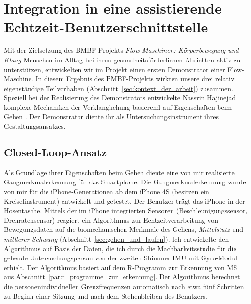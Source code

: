 

\chapter{Integration in eine assistierende Echtzeit-Benutzerschnittstelle} \label{cha:integration_in_eine_assistierende_echtzeit_benutzerschnittstelle}

Mit der Zielsetzung des \acs{BMBF}-Projekts \emph{Flow-Maschinen: Körperbewegung und Klang} Menschen im Alltag bei ihren gesundheitsförderlichen Absichten aktiv zu unterstützen, entwickelten wir im Projekt einen ersten Demonstrator einer Flow-Maschine. In diesem Ergebnis des \acs{BMBF}-Projekts wirkten unsere drei relativ eigenständige Teilvorhaben (Abschnitt~\ref{sec:kontext_der_arbeit}) zusammen. Speziell bei der Realisierung des Demonstrators entwickelte Nassrin Hajinejad komplexe Mechaniken der Verklanglichung basierend auf Eigenschaften beim Gehen \citep{Hajinejad2013, Hajinejad2015}. Der Demonstrator diente ihr als Untersuchungsinstrument ihres Gestaltungsansatzes.

\section{Closed-Loop-Ansatz} 

\label{sec:closed_loop_ansatz}

Als Grundlage ihrer Eigenschaften beim Gehen diente eine von mir realisierte Gangmerkmalerkennung für das Smartphone. Die Gangmerkmalerkennung wurde von mir für die iPhone-Generationen ab dem iPhone 4S (besitzen ein Kreiselinstrument) entwickelt und getestet. Der Benutzer trägt das iPhone in der Hosentasche. Mittels der im iPhone integrierten Sensoren (Beschleunigungssensor, Drehratensensor) reagiert ein Algorithmus zur Echtzeitverarbeitung von Bewegungsdaten auf die biomechanischen Merkmale des Gehens, \emph{Mittelstütz} und \emph{mittlerer Schwung} (Abschnitt~\ref{sec:gehen_und_laufen}). Ich entwickelte den Algorithmus auf Basis der Daten, die ich durch die Machbarkeitsstudie für die gehende Untersuchungsperson von der zweiten Shimmer \ac{IMU} mit Gyro-Modul erhielt. Der Algorithmus basiert auf dem R-Programm zur Erkennung von \ac{MS} aus Abschnitt~\ref{par:r_programme_zur_erkennung}. Der Algorithmus berechnet die personenindividuellen Grenzfrequenzen automatisch nach etwa fünf Schritten zu Beginn einer Sitzung und nach dem Stehenbleiben des Benutzers.

